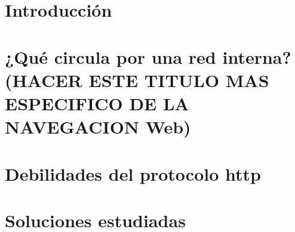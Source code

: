 \documentclass[12pt,twoside]{book}
\begin{document}
\nocite{*}

\frontmatter\pagestyle{empty}

\begin{titlepage}

\end{titlepage}

\begin{titlepage}

\end{titlepage}



\tableofcontents

\mainmatter\pagestyle{headings}


\chapter{Introducción}
    \label{capIntro}



\chapter{¿Qué circula por una red interna? (HACER ESTE TITULO MAS ESPECIFICO DE LA NAVEGACION Web) } 
    \label{capImp}



\chapter{Debilidades del protocolo http} 
    \label{capDesc}



\chapter{Soluciones estudiadas}
    \label{capVirtu}




%



%


%
\end{document}
